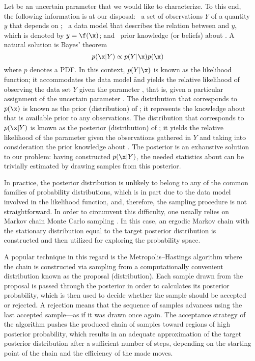 Let \x be an uncertain parameter that we would like to characterize. To this
end, the following information is at our disposal: \one~a set of observations
$Y$ of a quantity $y$ that depends on \x; \two~a data model \f that describes
the relation between \x and $y$, which is denoted by $y = \f(\x)$; and
\three~prior knowledge (or beliefs) about \x. A natural solution is Bayes'
theorem \cite{gelman2013}
\[
  p(\x | Y) \propto p(Y | \x) p(\x)
\]
where $p$ denotes a \ac{PDF}. In this context, $p(Y | \x)$ is known as the
likelihood function; it accommodates the data model \f and yields the relative
likelihood of observing the data set $Y$ given the parameter \x, that is, given
a particular assignment of the uncertain parameter \x. The distribution that
corresponds to $p(\x)$ is known as the prior (distribution) of \x; it represents
the knowledge about \x that is available prior to any observations. The
distribution that corresponds to $p(\x | Y)$ is known as the posterior
(distribution) of \x; it yields the relative likelihood of the parameter \x
given the observations gathered in $Y$ and taking into consideration the prior
knowledge about \x. The posterior is an exhaustive solution to our problem:
having constructed $p(\x | Y)$, the needed statistics about \x can be trivially
estimated by drawing samples from this posterior.

In practice, the posterior distribution is unlikely to belong to any of the
common families of probability distributions, which is in part due to the data
model involved in the likelihood function, and, therefore, the sampling
procedure is not straightforward. In order to circumvent this difficulty, one
usually relies on Markov chain Monte Carlo sampling \cite{gelman2013}. In this
case, an ergodic Markov chain with the stationary distribution equal to the
target posterior distribution is constructed and then utilized for exploring the
probability space.

A popular technique in this regard is the Metropolis--Hastings algorithm
\cite{gelman2013} where the chain is constructed via sampling from a
computationally convenient distribution known as the proposal (distribution).
Each sample drawn from the proposal is passed through the posterior in order to
calculates its posterior probability, which is then used to decide whether the
sample should be accepted or rejected. A rejection means that the sequence of
samples advances using the last accepted sample---as if it was drawn once again.
The acceptance strategy of the algorithm pushes the produced chain of samples
toward regions of high posterior probability, which results in an adequate
approximation of the target posterior distribution after a sufficient number of
steps, depending on the starting point of the chain and the efficiency of the
made moves.
